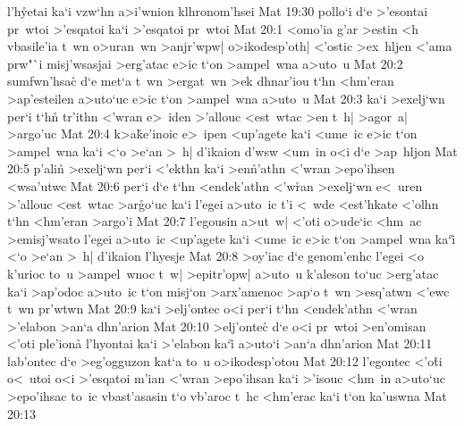 l'h\r{y}etai
ka`i
vzw`hn
a>i'wnion
klhronom'hsei\bibvsend
\vs Mat 19:30
pollo`i
d`e
>'esontai
pr~wtoi
>'esqatoi
ka`i
>'esqatoi
pr~wtoi\bibvsend
\vs Mat 20:1
<omo'ia
g'ar
>estin
<h
vbasile'ia
t~wn
o>uran~wn
>anjr'wpw|
o>ikodesp'oth|
<'ostic
>ex~hljen
<'ama
prw"`i
misj'wsasjai
>erg'atac
e>ic
t`on
>ampel~wna
a>uto~u\bibvsend
\vs Mat 20:2
sumfwn'hsac\r{}
d`e
met`a
t~wn
>ergat~wn
>ek
dhnar'iou
t`hn
<hm'eran
>ap'esteilen
a>uto`uc
e>ic
t`on
>ampel~wna
a>uto~u\bibvsend
\vs Mat 20:3
ka`i
>exelj`wn
per`i
t`h\r{n}
tr'ithn
<'wran
e>~iden
>'allouc
<est~wtac
>en
t~h|
>agor~a|
>argo'uc\bibvsend
\vs Mat 20:4
k>a\r{k}e'inoic
e>~ipen
<up'agete
ka`i
<ume~ic
e>ic
t`on
>ampel~wna
ka`i
<`o
>e`an
>~h|
d'ikaion
d'wsw
<um~in
o<i
d`e
>ap~hljon\bibvsend
\vs Mat 20:5
p'ali\r{n}
>exelj`wn
per`i
<'ekthn
ka`i
>en\r{n}'athn
<'wran
>epo'ihsen
<wsa'utwc\bibvsend
\vs Mat 20:6
per`i
d`e
t`hn
<endek'athn
<'w\r{r}an
>exelj`wn
e<~uren
>'allouc
<est~wtac
>ar\r{g}o`uc
ka`i
l'egei
a>uto~ic
t'i
<~wde
<est'hkate
<'olhn
t`hn
<hm'eran
>argo'i\bibvsend
\vs Mat 20:7
l'egousin
a>ut~w|
<'oti
o>ude`ic
<hm~ac
>emisj'wsato
l'egei
a>uto~ic
<up'agete
ka`i
<ume~ic
e>ic
t`on
>ampel~wna
ka`i\r{}
<`o
>e`an
>~h|
d'ikaion
l'hyesje\bibvsend
\vs Mat 20:8
>oy'iac
d`e
genom'enhc
l'egei
<o
k'urioc
to~u
>ampel~wnoc
t~w|
>epitr'opw|
a>uto~u
k'aleson
to`uc
>erg'atac
ka`i
>ap'odoc
a>uto~ic
t`on
misj`on
>arx'amenoc
>ap`o
t~wn
>esq'atwn
<'ewc
t~wn
pr'wtwn\bibvsend
\vs Mat 20:9
ka`i
>elj'ontec
o<i
per`i
t`hn
<endek'athn
<'wran
>'elabon
>an`a
dhn'arion\bibvsend
\vs Mat 20:10
>elj'ontec\r{}
d`e
o<i
pr~wtoi
>en'omisan
<'oti
ple'iona\r{}
l'hyontai
ka`i
>'elabon
ka`i\r{}
a>uto`i
>an`a
dhn'arion\bibvsend
\vs Mat 20:11
lab'ontec
d`e
>eg'ogguzon
kat`a
to~u
o>ikodesp'otou\bibvsend
\vs Mat 20:12
l'egontec
<'o\r{t}i
o<~utoi
o<i
>'esqatoi
m'ian
<'wran
>epo'ihsan
ka`i
>'isouc
<hm~in
a>uto`uc
>epo'ihsac
to~ic
vbast'asasin
t`o
vb'aroc
t~hc
<hm'erac
ka`i
t`on
ka'uswna\bibvsend
\vs Mat 20:13
